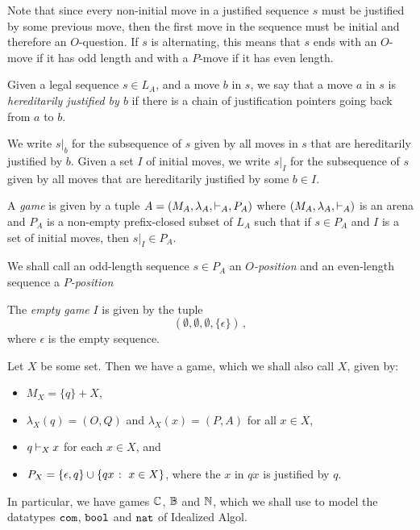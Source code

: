 \documentclass[11pt]{report}
\begin{document}
Note that since every non-initial move in a justified sequence $s$ must be justified by some previous move, then the first move in the sequence must be initial and therefore an $O$-question.  
If $s$ is alternating, this means that $s$ ends with an $O$-move if it has odd length and with a $P$-move if it has even length.  

\begin{definition}
  Given a legal sequence $s\in L_A$, and a move $b$ in $s$, we say that a move $a$ in $s$ is \emph{hereditarily justified by $b$} if there is a chain of justification pointers going back from $a$ to $b$.

  We write $s\vert_b$ for the subsequence of $s$ given by all moves in $s$ that are hereditarily justified by $b$.
  Given a set $I$ of initial moves, we write $s\vert_I$ for the subsequence of $s$ given by all moves that are hereditarily justified by some $b\in I$.

  A \emph{game} is given by a tuple $A=(M_A,\lambda_A,\mathbin{\vdash}_A,P_A)$ where $(M_A,\lambda_A,\mathbin{\vdash}_A)$ is an arena and $P_A$ is a non-empty prefix-closed subset of $L_A$ such that if $s\in P_A$ and $I$ is a set of initial moves, then $s\vert_I\in P_A$.
\end{definition}

We shall call an odd-length sequence $s\in P_A$ an \emph{$O$-position} and an even-length sequence a \emph{$P$-position}

\begin{example}
  The \emph{empty game} $I$ is given by the tuple
  \[
    (\emptyset,\emptyset,\emptyset,\{\epsilon\})\,,
    \]
  where $\epsilon$ is the empty sequence.
  \label{ExEmptyGame}
\end{example}

\begin{example}
  Let $X$ be some set.  
  Then we have a game, which we shall also call $X$, given by:
  \begin{itemize}
    \item $M_X = \{q\} + X$, 
    \item $\lambda_X(q)=(O,Q)$ and $\lambda_X(x)=(P,A)$ for all $x\in X$, 
    \item $q\mathbin{\vdash}_X x$ for each $x\in X$, and
    \item $P_X = \{\epsilon,q\}\cup\{qx\;\colon\; x\in X\}$, where the $x$ in $qx$ is justified by $q$.
  \end{itemize}

  In particular, we have games $\mathbb{C}$, $\mathbb{B}$ and $\mathbb{N}$, which we shall use to model the datatypes ${\mathtt{com}}$, ${\mathtt{bool}}$ and ${\mathtt{nat}}$ of Idealized Algol.
\end{example}
\end{document}
